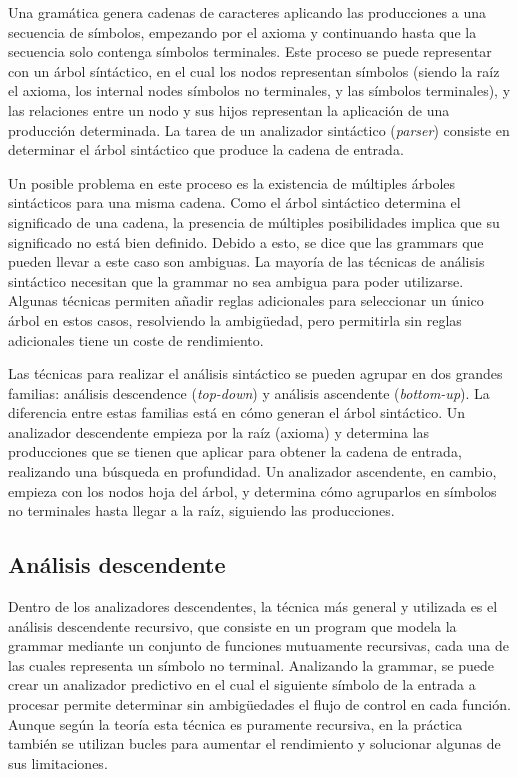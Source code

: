 Una gramática genera cadenas de caracteres aplicando las producciones a una
secuencia de símbolos, empezando por el axioma y continuando hasta que la
secuencia solo contenga símbolos terminales. Este proceso se puede representar
con un árbol síntáctico, en el cual los nodos representan símbolos (siendo la
raíz el axioma, los \glspl{internal node} símbolos no terminales, y las
 símbolos terminales), y las relaciones entre un nodo
y sus hijos representan la aplicación de una producción determinada. La tarea de
un analizador sintáctico (\textit{\gls{parser}}) consiste en determinar el árbol
sintáctico que produce la cadena de entrada. \parencite{dragon-book}

Un posible problema en este proceso es la existencia de múltiples árboles
sintácticos para una misma cadena. Como el árbol sintáctico determina el
significado de una cadena, la presencia de múltiples posibilidades implica que
su significado no está bien definido. Debido a esto, se dice que las
\glspl{grammar} que pueden llevar a este caso son ambiguas. La mayoría de las
técnicas de análisis sintáctico necesitan que la \gls{grammar} no sea ambigua
para poder utilizarse. Algunas técnicas permiten añadir reglas adicionales para
seleccionar un único árbol en estos casos, resolviendo la ambigüedad, pero
permitirla sin reglas adicionales tiene un coste de rendimiento.
\parencite{dragon-book}

Las técnicas para realizar el análisis sintáctico se pueden agrupar en dos
grandes familias: análisis descendence (\textit{top-down}) y análisis ascendente
(\textit{bottom-up}). La diferencia entre estas familias está en cómo generan el
árbol sintáctico. Un analizador descendente empieza por la raíz (axioma) y
determina las producciones que se tienen que aplicar para obtener la cadena de
entrada, realizando una búsqueda en profundidad. Un analizador ascendente, en
cambio, empieza con los nodos hoja del árbol, y determina cómo agruparlos en
símbolos no terminales hasta llegar a la raíz, siguiendo las producciones.
\parencite{dragon-book}

\subsection{Análisis descendente}

Dentro de los analizadores descendentes, la técnica más general y utilizada es
el análisis descendente recursivo, que consiste en un \gls{program} que modela
la \gls{grammar} mediante un conjunto de funciones mutuamente recursivas, cada
una de las cuales representa un símbolo no terminal. Analizando la
\gls{grammar}, se puede crear un analizador predictivo en el cual el siguiente
símbolo de la entrada a procesar permite determinar sin ambigüedades el flujo de
control en cada función. Aunque según la teoría esta técnica es puramente
recursiva, en la práctica también se utilizan bucles para aumentar el
rendimiento y solucionar algunas de sus limitaciones. \parencite{dragon-book}

